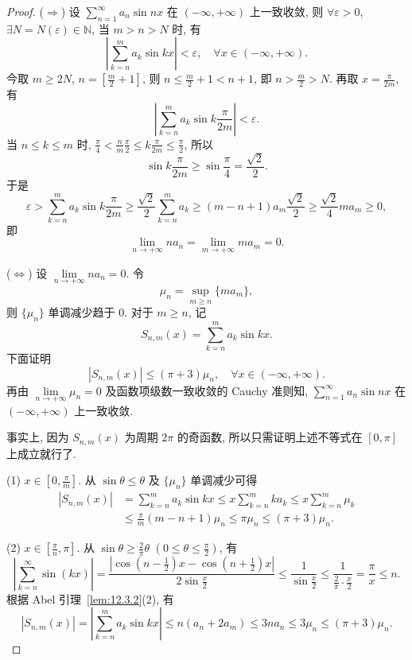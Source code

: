 \begin{proof}
($\Rightarrow$) 设 $\sum_{n=1}^{\infty}a_{n}\sin nx$ 在 $(-\infty,+\infty)$ 上一致收敛, 则 $\forall\varepsilon>0$, $\exists N=N(\varepsilon)\in\mathbb{N}$, 当 $m>n>N$ 时, 有
\[
  \left|\sum_{k=n}^{m}a_{k}\sin kx\right|<\varepsilon,\quad\forall x\in(-\infty,+\infty).
\]
今取 $m\geqslant2N$, $n=\left[\frac{m}{2}+1\right]$, 则 $n\leqslant\frac{m}{2}+1<n+1$, 即 $n>\frac{m}{2}>N$. 再取 $x=\frac{\pi}{2m}$, 有
\[
  \left|\sum_{k=n}^{m}a_{k}\sin k\frac{\pi}{2m}\right|<\varepsilon.
\]
当 $n\leqslant k\leqslant m$ 时, $\frac{\pi}{4}<\frac{n}{m}\frac{\pi}{2}\leqslant k\frac{\pi}{2m}\leqslant\frac{\pi}{2}$, 所以
\[
  \sin k\frac{\pi}{2m}\geqslant\sin\frac{\pi}{4}=\frac{\sqrt{2}}{2}.
\]
于是
\[
  \varepsilon>\sum_{k=n}^{m}a_{k}\sin k\frac{\pi}{2m}\geqslant\frac{\sqrt{2}}{2}\sum_{k=n}^{m}a_{k}\geqslant(m-n+1)a_{m}\frac{\sqrt{2}}{2}\geqslant\frac{\sqrt{2}}{4}ma_{m}\geqslant0,
\]
即
\[
  \lim_{n\to+\infty}na_{n}=\lim_{m\to+\infty}ma_{m}=0.
\]

($\Leftrightarrow$) 设 $\lim\limits_{n\to+\infty}na_{n}=0$. 令
\[
  \mu_{n}=\sup_{m\geqslant n}\{ma_{m}\},
\]
则 $\{\mu_{n}\}$ 单调减少趋于 $0$. 对于 $m\geqslant n$, 记
\[
  S_{n,m}(x)=\sum_{k=n}^{m}a_{k}\sin kx.
\]
下面证明
\[
  |S_{n,m}(x)|\leqslant(\pi+3)\mu_{n},\quad\forall x\in(-\infty,+\infty).
\]
再由 $\lim\limits_{n\to+\infty}\mu_{n}=0$ 及函数项级数一致收敛的 Cauchy 准则知, $\sum_{n=1}^{\infty}a_{n}\sin nx$ 在 $(-\infty,+\infty)$ 上一致收敛.

事实上, 因为 $S_{n,m}(x)$ 为周期 $2\pi$ 的奇函数, 所以只需证明上述不等式在 $[0,\pi]$ 上成立就行了.

(1) $x\in\left[0,\frac{\pi}{m}\right]$. 从 $\sin\theta\leqslant\theta$ 及 $\{\mu_{n}\}$ 单调减少可得
\[
  \begin{aligned}
    |S_{n,m}(x)|&=\sum_{k=n}^{m}a_{k}\sin kx\leqslant x\sum_{k=n}^{m}ka_{k}\leqslant x\sum_{k=n}^{m}\mu_{k}\\
    &\leqslant\frac{\pi}{m}(m-n+1)\mu_{n}\leqslant\pi\mu_{n}\leqslant(\pi+3)\mu_{n}.
  \end{aligned}
\]

(2) $x\in\left[\frac{\pi}{n},\pi\right]$. 从 $\sin\theta\geqslant\frac{2}{\pi}\theta$ $\left(0\leqslant\theta\leqslant\frac{\pi}{2}\right)$, 有
\[
  \left|\sum_{k=n}^{\infty}\sin(kx)\right|=\frac{\left|\cos\left(n-\frac{1}{2}\right)x-\cos\left(n+\frac{1}{2}\right)x\right|}{2\sin\frac{x}{2}}\leqslant\frac{1}{\sin\frac{x}{2}}\leqslant\frac{1}{\frac{2}{\pi}\cdot\frac{x}{2}}=\frac{\pi}{x}\leqslant n.
\]
根据 Abel 引理~\ref{lem:12.3.2}(2), 有
\[
  |S_{n,m}(x)|=\left|\sum_{k=n}^{m}a_{k}\sin kx\right|\leqslant n(a_{n}+2a_{m})\leqslant3na_{n}\leqslant3\mu_{n}\leqslant(\pi+3)\mu_{n}.
\]


\end{proof}
